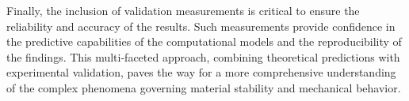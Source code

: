 Finally, the inclusion of validation measurements is critical to ensure the reliability and accuracy of the results. Such measurements provide confidence in the predictive capabilities of the computational models and the reproducibility of the findings. This multi-faceted approach, combining theoretical predictions with experimental validation, paves the way for a more comprehensive understanding of the complex phenomena governing material stability and mechanical behavior.